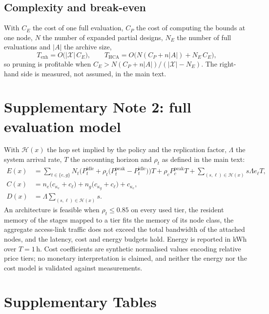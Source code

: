 \documentclass[preprint,11pt,3p]{elsarticle}
\theoremstyle{plain}
\theoremstyle{definition}
\newcommand{\X}{\mathcal{X}}
\begin{document}
\subsection*{Complexity and break-even}
With $C_E$ the cost of one full evaluation, $C_P$ the cost of computing the bounds at one
node, $N$ the number of expanded partial designs, $N_E$ the number of full evaluations and
$|A|$ the archive size,
\begin{equation}
T_{\mathrm{exh}}=O\big(|\X|\,C_E\big),\qquad
T_{\mathrm{HCA}}=O\big(N(C_P+n|A|)+N_E\,C_E\big),
\end{equation}
so pruning is profitable when $C_E>N(C_P+n|A|)/(|\X|-N_E)$. The right-hand side is
measured, not assumed, in the main text.

\clearpage
\section*{Supplementary Note 2: full evaluation model}

With $\mathcal{H}(x)$ the hop set implied by the policy and the replication factor,
$\Lambda$ the system arrival rate, $T$ the accounting horizon and $\rho_t$ as defined in
the main text:
\begin{align}
E(x) &= \sum_{t\in\{e,g\}} N_t\Big(P^{\mathrm{idle}}_t+\rho_t\big(P^{\mathrm{peak}}_t-
        P^{\mathrm{idle}}_t\big)\Big)T
      + \rho_c P^{\mathrm{peak}}_c T
      + \sum_{(s,\ell)\in\mathcal{H}(x)} s\Lambda e_\ell T, \\
C(x) &= n_e\big(c_{\kappa_e}+c_\ell\big)+n_g\big(c_{\kappa_g}+c_\ell\big)+c_{\kappa_c}, \\
D(x) &= \Lambda \sum_{(s,\ell)\in\mathcal{H}(x)} s .
\end{align}
An architecture is feasible when $\rho_t\le0.85$ on every used tier, the resident memory
of the stages mapped to a tier fits the memory of its node class, the aggregate
access-link traffic does not exceed the total bandwidth of the attached nodes, and the
latency, cost and energy budgets hold. Energy is reported in kWh over $T=1$\,h. Cost
coefficients are synthetic normalised values encoding relative price tiers; no monetary
interpretation is claimed, and neither the energy nor the cost model is validated against
measurements.

\clearpage
\section*{Supplementary Tables}
\end{document}
